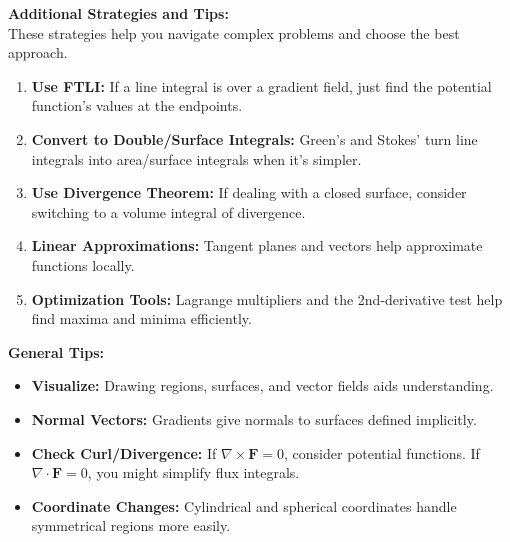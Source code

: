 \documentclass[9pt]{article}
\begin{document}
\begin{multicols}{2}
\footnotesize

\noindent \textbf{Additional Strategies and Tips:}\\
These strategies help you navigate complex problems and choose the best approach.

\begin{tcolorbox}[title=, colframe=brightpink]
\begin{enumerate}
    \item \textbf{Use FTLI:} If a line integral is over a gradient field, just find the potential function’s values at the endpoints.
    \item \textbf{Convert to Double/Surface Integrals:} Green’s and Stokes’ turn line integrals into area/surface integrals when it’s simpler.
    \item \textbf{Use Divergence Theorem:} If dealing with a closed surface, consider switching to a volume integral of divergence.
    \item \textbf{Linear Approximations:} Tangent planes and vectors help approximate functions locally.
    \item \textbf{Optimization Tools:} Lagrange multipliers and the 2nd-derivative test help find maxima and minima efficiently.
\end{enumerate}
\end{tcolorbox}

\begin{tcolorbox}[title=, colframe=brightyellow]
\textbf{General Tips:}
\begin{itemize}
    \item \textbf{Visualize:} Drawing regions, surfaces, and vector fields aids understanding.
    \item \textbf{Normal Vectors:} Gradients give normals to surfaces defined implicitly.
    \item \textbf{Check Curl/Divergence:} If $\nabla\times\mathbf{F}=0$, consider potential functions. If $\nabla\cdot\mathbf{F}=0$, you might simplify flux integrals.
    \item \textbf{Coordinate Changes:} Cylindrical and spherical coordinates handle symmetrical regions more easily.
\end{itemize}
\end{tcolorbox}

\end{multicols}
\end{document}
